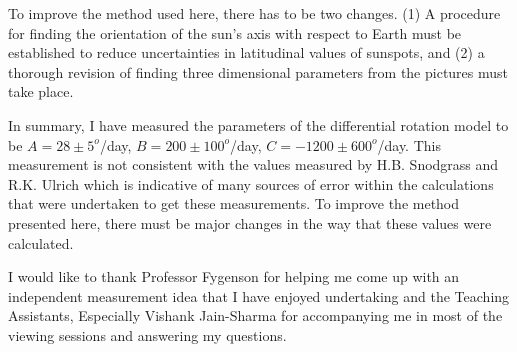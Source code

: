 \documentclass[aps,twocolumn,showpacs,preprintnumbers]{revtex4}
\begin{document}
To improve the method used here, there has to be two changes. (1) A procedure for finding the orientation of the sun's axis with respect to Earth must be established to reduce uncertainties in latitudinal values of sunspots, and (2) a thorough revision of finding three dimensional parameters from the pictures must take place.  

In summary, I have measured the parameters of the differential rotation model to be $A = 28 \pm 5 ^o$/day, $B = 200 \pm 100 ^o$/day, $C = -1200 \pm 600 ^o$/day. This measurement is not consistent with the values measured by H.B. Snodgrass and R.K. Ulrich which is indicative of many sources of error within the calculations that were undertaken to get these measurements. To improve the method presented here, there must be major changes in the way that these values were calculated. 

I would like to thank Professor Fygenson for helping me come up with an independent measurement idea that I have enjoyed undertaking and the Teaching Assistants, Especially Vishank Jain-Sharma for accompanying me in most of the viewing sessions and answering my questions. 
\end{document}
